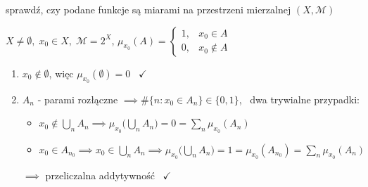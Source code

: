 \documentclass[a4paper,12pt]{article}
\begin{document}
\bigskip
{} \; sprawdź, czy podane funkcje są miarami na przestrzeni mierzalnej \((X, \mathcal{M})\)
\begin{podpunkty}
    \item \(X \neq \emptyset, \; x_0 \in X, \; \mathcal{M} = 2^X\), \; \(\mu_{x_0}(A) = \begin{cases} 1, & x_0 \in A \\ 0, & x_0 \notin A \end{cases}\)
    \begin{enumerate}[label=\roman*), leftmargin=1.9em, itemsep=0.2em, topsep=0.2em, parsep=0pt, partopsep=0pt]
        \item \(x_0 \notin \emptyset\), więc \(\mu_{x_0}(\emptyset) = 0\) \, \(\checkmark\)
        \item \(A_n\) - parami rozłączne \(\implies \#\{n : x_0 \in A_n\} \in \{0, 1\}\), \, dwa trywialne przypadki:
        \begin{itemize}
            \item[\(0\):] \(x_0 \notin \bigcup_n A_n \implies \mu_{x_0}\big(\bigcup_n A_n\big) = 0 = \sum_n \mu_{x_0}(A_n)\)
            \item[\(1\):] \(x_0 \in A_{n_0} \implies x_0 \in \bigcup_n A_n \implies \mu_{x_0}\big(\bigcup_n A_n\big) = 1 = \mu_{x_0}(A_{n_0}) = \sum_n \mu_{x_0}(A_n)\)
        \end{itemize}
        \(\implies\) przeliczalna addytywność \, \(\checkmark\)
    \end{enumerate}


\end{podpunkty}
\end{document}
